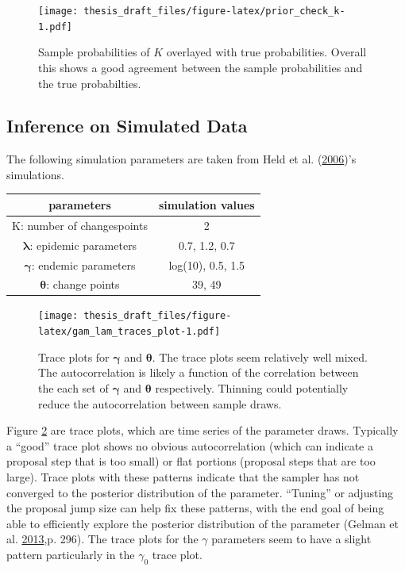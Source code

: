 \documentclass[11pt,a4paper]{article}
\begin{document}
\begin{figure}
\centering
\texttt{[image: thesis\_draft\_files/figure-latex/prior\_check\_k-1.pdf]}
\caption{\label{fig:pois_hist} Sample probabilities of \(K\) overlayed
with true probabilities. Overall this shows a good agreement between the
sample probabilities and the true probabilties.}
\end{figure}

\hypertarget{inference-on-simulated-data}{%
\subsection{Inference on Simulated
Data}\label{inference-on-simulated-data}}

The following simulation parameters are taken from Held et al.
(\protect\hyperlink{ref-held_two-component_2006}{2006})'s simulations.

\pagebreak

\begin{longtable}[]{@{}cc@{}}
\toprule
parameters & simulation values\tabularnewline
\midrule
\endhead
K: number of changespoints & 2\tabularnewline
\(\boldsymbol{\lambda}\): epidemic parameters & 0.7, 1.2,
0.7\tabularnewline
\(\boldsymbol{\gamma}\): endemic parameters & log(10), 0.5,
1.5\tabularnewline
\(\boldsymbol{\theta}\): change points & 39, 49\tabularnewline
\bottomrule
\end{longtable}

\begin{figure}
\centering
\texttt{[image: thesis\_draft\_files/figure-latex/gam\_lam\_traces\_plot-1.pdf]}
\caption{\label{fig:lam_trace} Trace plots for \(\boldsymbol{\gamma}\)
and \(\boldsymbol{\theta}\). The trace plots seem relatively well mixed.
The autocorrelation is likely a function of the correlation between the
each set of \(\boldsymbol{\gamma}\) and \(\boldsymbol{\theta}\)
respectively. Thinning could potentially reduce the autocorrelation
between sample draws.}
\end{figure}

Figure \ref{fig:lam_trace} are trace plots, which are time series of the
parameter draws. Typically a ``good'' trace plot shows no obvious
autocorrelation (which can indicate a proposal step that is too small)
or flat portions (proposal steps that are too large). Trace plots with
these patterns indicate that the sampler has not converged to the
posterior distribution of the parameter. ``Tuning'' or adjusting the
proposal jump size can help fix these patterns, with the end goal of
being able to efficiently explore the posterior distribution of the
parameter (Gelman et al.
\protect\hyperlink{ref-gelman_bayesian_2013}{2013},p. 296). The trace
plots for the \(\gamma\) parameters seem to have a slight pattern
particularly in the \(\gamma_0\) trace plot.
\end{document}
